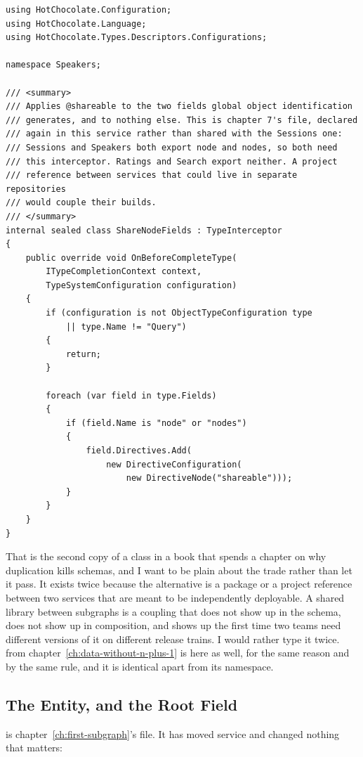 \begin{verbatim}
using HotChocolate.Configuration;
using HotChocolate.Language;
using HotChocolate.Types.Descriptors.Configurations;

namespace Speakers;

/// <summary>
/// Applies @shareable to the two fields global object identification
/// generates, and to nothing else. This is chapter 7's file, declared
/// again in this service rather than shared with the Sessions one:
/// Sessions and Speakers both export node and nodes, so both need
/// this interceptor. Ratings and Search export neither. A project
/// reference between services that could live in separate repositories
/// would couple their builds.
/// </summary>
internal sealed class ShareNodeFields : TypeInterceptor
{
    public override void OnBeforeCompleteType(
        ITypeCompletionContext context,
        TypeSystemConfiguration configuration)
    {
        if (configuration is not ObjectTypeConfiguration type
            || type.Name != "Query")
        {
            return;
        }

        foreach (var field in type.Fields)
        {
            if (field.Name is "node" or "nodes")
            {
                field.Directives.Add(
                    new DirectiveConfiguration(
                        new DirectiveNode("shareable")));
            }
        }
    }
}
\end{verbatim}

%
That is the second copy of a class in a book that spends a chapter on why
duplication kills schemas, and I want to be plain about the trade rather than
let it pass. It exists twice because the alternative is a package or a project
reference between two services that are meant to be independently deployable. A shared library between subgraphs is a coupling
that does not show up in the schema, does not show up in composition, and
shows up the first time two teams need different versions of it on different
release trains. I would rather type it twice.  from
chapter~\ref{ch:data-without-n-plus-1} is here as well, for the same reason and
by the same rule, and it is identical apart from its namespace.

\subsection{The Entity, and the Root Field}

%
 is chapter~\ref{ch:first-subgraph}'s file. It has moved
service and changed nothing that matters:

